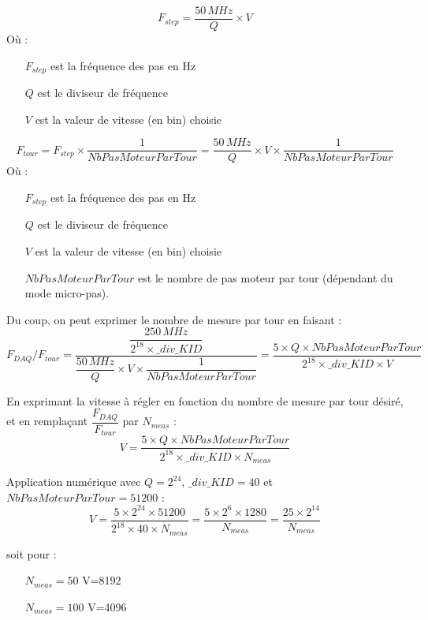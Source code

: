 \documentclass[11pt,a4paper,oneside,onecolumn]{article}
\begin{document}
\begin{equation}
 F_{step}=\dfrac{50\,MHz}{Q} \times V
\end{equation}
Où :
\begin{itemize}
 \item [$F_{step}$] est la fréquence des pas en Hz
 \item [$Q$] est le diviseur de fréquence
 \item [$V$] est la valeur de vitesse (en bin) choisie
 \end{itemize}

 \begin{equation}
 F_{tour}=F_{step} \times \dfrac{1}{NbPasMoteurParTour}= \dfrac{50\,MHz}{Q} \times V \times \dfrac{1}{NbPasMoteurParTour}
\end{equation}
Où :
\begin{itemize}
 \item [$F_{step}$] est la fréquence des pas en Hz
 \item [$Q$] est le diviseur de fréquence
 \item [$V$] est la valeur de vitesse (en bin) choisie
 \item [$NbPasMoteurParTour$] est le nombre de pas moteur par tour (dépendant du mode micro-pas).
 \end{itemize}
 
Du coup, on peut exprimer le nombre de mesure par tour en faisant :
 \begin{equation}
 F_{DAQ}/F_{tour}=\dfrac{\dfrac{250\,MHz}{2^{18} \times \_div\_KID}} {\dfrac{50\,MHz}{Q} \times V \times \dfrac{1}{NbPasMoteurParTour}}
 =\dfrac{5 \times Q \times NbPasMoteurParTour}{2^{18}  \times \_div\_KID \times V}
\end{equation}
 
En exprimant la vitesse à régler en fonction du nombre de mesure par tour désiré, et en remplaçant $\dfrac{F_{DAQ}}{F_{tour}}$ par $N_{meas}$ :
 \begin{equation}
 V= \dfrac{5 \times Q \times NbPasMoteurParTour}{2^{18}  \times \_div\_KID \times N_{meas}}
\end{equation}

Application numérique avec $Q=2^{24}$, $\_div\_KID=40$ et $NbPasMoteurParTour=51200$ :
 \begin{equation}
 V= \dfrac{5 \times 2^{24} \times 51200}{2^{18}  \times 40 \times N_{meas}}= \dfrac{5 \times 2^{6} \times 1280}{N_{meas}}=\dfrac{25 \times 2^{14}}{N_{meas}}
\end{equation}

soit pour :
\begin{itemize}
 \item [$N_{meas}=50$] V=8192
 \item [$N_{meas}=100$] V=4096
\end{itemize}
\end{document}

